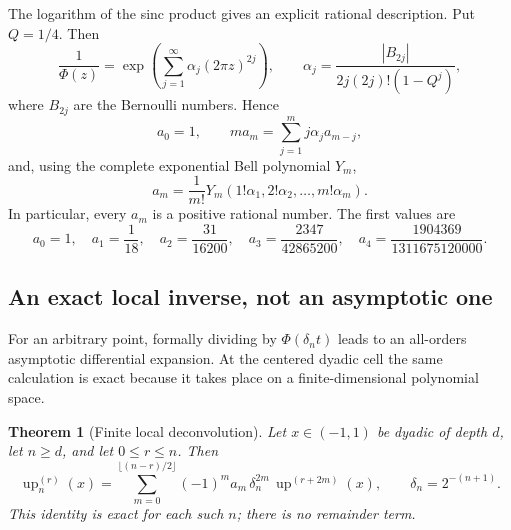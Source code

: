 \documentclass[11pt]{article}
\newtheorem{theorem}{Theorem}[section]
\newcommand{\upf}{\operatorname{up}}
\begin{document}
The logarithm of the sinc product gives an explicit rational description.  Put
\(Q=1/4\).  Then
\begin{equation}\label{eq:alpha}
 \frac1{\Phi(z)}
 =\exp\!\left(\sum_{j=1}^{\infty}\alpha_j(2\pi z)^{2j}\right),
 \qquad
 \alpha_j=\frac{|B_{2j}|}{2j(2j)!(1-Q^j)},
\end{equation}
where \(B_{2j}\) are the Bernoulli numbers.  Hence
\begin{equation}\label{eq:a-recurrence}
 a_0=1,
 \qquad
 m a_m=\sum_{j=1}^{m}j\alpha_j a_{m-j},
\end{equation}
and, using the complete exponential Bell polynomial \(Y_m\),
\begin{equation}\label{eq:a-bell}
 a_m=\frac1{m!}Y_m(1!\alpha_1,2!\alpha_2,\ldots,m!\alpha_m).
\end{equation}
In particular, every \(a_m\) is a positive rational number.  The first values
are
\begin{equation}\label{eq:first-a}
 a_0=1,
 \quad a_1=\frac1{18},
 \quad a_2=\frac{31}{16200},
 \quad a_3=\frac{2347}{42865200},
 \quad a_4=\frac{1904369}{1311675120000}.
\end{equation}

\subsection{An exact local inverse, not an asymptotic one}

For an arbitrary point, formally dividing by \(\Phi(\delta_n t)\) leads to an
all-orders asymptotic differential expansion.  At the centered dyadic cell the
same calculation is exact because it takes place on a finite-dimensional
polynomial space.

\begin{theorem}[Finite local deconvolution]\label{thm:local-deconvolution}
Let \(x\in(-1,1)\) be dyadic of depth \(d\), let \(n\ge d\), and let
\(0\le r\le n\).  Then
\begin{equation}\label{eq:exact-local-inverse}
 \boxed{\displaystyle
 \upf_n^{(r)}(x)=
 \sum_{m=0}^{\lfloor(n-r)/2\rfloor}
 (-1)^m a_m\,\delta_n^{2m}\,\upf^{(r+2m)}(x),
 \qquad \delta_n=2^{-(n+1)}.}
\end{equation}
This identity is exact for each such \(n\); there is no remainder term.
\end{theorem}
\end{document}
